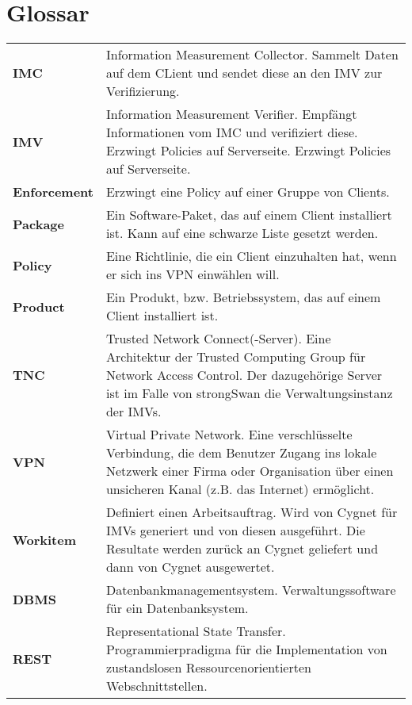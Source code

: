 \chapter{Glossar}

{
\renewcommand{\arraystretch}{1.5}
\begin{longtable}{ll}
\textbf{IMC} & Information Measurement Collector. Sammelt Daten auf dem CLient und sendet diese an den IMV zur Verifizierung.\\

\textbf{IMV} & Information Measurement Verifier. Empfängt Informationen vom IMC und verifiziert diese. Erzwingt Policies auf Serverseite. Erzwingt Policies auf Serverseite.\\

\textbf{Enforcement} & Erzwingt eine Policy auf einer Gruppe von Clients.\\

\textbf{Package} & Ein Software-Paket, das auf einem Client installiert ist. Kann auf eine schwarze Liste
gesetzt werden.\\

\textbf{Policy} & Eine Richtlinie, die ein Client einzuhalten hat, wenn er sich ins VPN einwählen will.\\

\textbf{Product} & Ein Produkt, bzw. Betriebssystem, das auf einem Client installiert ist.\\

\textbf{TNC} & Trusted Network Connect(-Server). Eine Architektur der Trusted Computing Group für
Network Access Control. Der dazugehörige Server ist im Falle von strongSwan die
Verwaltungsinstanz der IMVs.\\

\textbf{VPN }& Virtual Private Network. Eine verschlüsselte Verbindung, die dem Benutzer Zugang ins
lokale Netzwerk einer Firma oder Organisation über einen unsicheren Kanal (z.B. das
Internet) ermöglicht.\\
 
\textbf{Workitem} & Definiert einen Arbeitsauftrag. Wird von Cygnet für IMVs generiert und von diesen
ausgeführt. Die Resultate werden zurück an Cygnet geliefert und dann von Cygnet
ausgewertet.\\
 
\textbf{DBMS} & Datenbankmanagementsystem. Verwaltungssoftware für ein Datenbanksystem.\\

\textbf{REST} & Representational State Transfer. Programmierpradigma für die Implementation von zustandslosen Ressourcenorientierten Webschnittstellen.\\


\end{longtable}}
